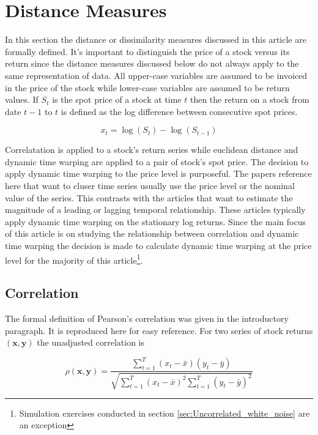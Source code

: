 \documentclass[12pt]{article}
\begin{document}
\section{Distance Measures} \label{sec:Distance_Measures}

In this section the distance or dissimilarity measures discussed in this article are formally defined. It's important to distinguish the price of a stock versus its return since the distance measures discussed below do not always apply to the same representation of data. All upper-case variables are assumed to be invoiced in the price of the stock while lower-case variables are assumed to be return values. If $S_{t}$ is the spot price of a stock at time $t$ then the return on a stock from date $t-1$ to $t$ is defined as the log difference between consecutive spot prices.

\begin{equation} \label{eq:log_return_def}
    x_{t} = \log \left(S_{t}\right) - \log\left(S_{t-1}\right)
\end{equation}

 Correlatation is applied to a stock's return series while euclidean distance and dynamic time warping are applied to a pair of stock's spot price. The decision to apply dynamic time warping to the price level is purposeful. The papers reference here that want to cluser time series usually use the price level or the nominal value of the series. This contrasts with the articles that want to estimate the magnitude of a leading or lagging temporal relationship. These articles typically apply dynamic time warping on the stationary log returns. Since the main focus of this article is on studying the relationship between correlation and dynamic time warping the decision is made to calculate dynamic time warping at the price level for the majority of this article\footnote{Simulation exercises conducted in section \ref{sec:Uncorrelated_white_noise} are an exception}.

\subsection{Correlation}

The formal definition of Pearson's correlation was given in the introductory paragraph. It is reproduced here for easy reference. For two series of stock returns $(\boldsymbol{x}, \boldsymbol{y})$ the unadjusted correlation is

\begin{equation} \label{eq:pearsons_rho}
\rho(\boldsymbol{x}, \boldsymbol{y}) = \frac{ \sum_{t=1}^{T} (x_{t} - \bar{x}) (y_{t} - \bar{y})}{ \sqrt{\sum_{t=1}^{T} (x_{t} - \bar{x})^{2} \sum_{t=1}^{T} (y_{t} - \bar{y})^{2}}}
\end{equation}
\end{document}
